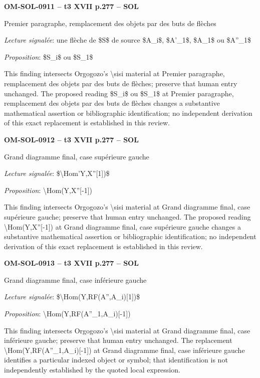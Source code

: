 \par\noindent\textbf{OM-SOL-0911 -- t3 XVII p.277 -- SOL}\par
Premier paragraphe, remplacement des objets par des buts de flèches\par
\emph{Lecture signalée}: une flèche de \$S\$ de source \$A\_i\$, \$A'\_1\$, \$A\_1\$ ou \$A''\_1\$\par
\emph{Proposition}: \$S\_i\$ ou \$S\_1\$\par
This finding intersects Orgogozo's \textbackslash{}sisi material at Premier paragraphe, remplacement des objets par des buts de flèches; preserve that human entry unchanged. The proposed reading \$S\_i\$ ou \$S\_1\$ at Premier paragraphe, remplacement des objets par des buts de flèches changes a substantive mathematical assertion or bibliographic identification; no independent derivation of this exact replacement is established in this review.\par
\par\noindent\textbf{OM-SOL-0912 -- t3 XVII p.277 -- SOL}\par
Grand diagramme final, case supérieure gauche\par
\emph{Lecture signalée}: \$\textbackslash{}Hom'Y,X''[1])\$\par
\emph{Proposition}: \textbackslash{}Hom(Y,X''[-1])\par
This finding intersects Orgogozo's \textbackslash{}sisi material at Grand diagramme final, case supérieure gauche; preserve that human entry unchanged. The proposed reading \textbackslash{}Hom(Y,X''[-1]) at Grand diagramme final, case supérieure gauche changes a substantive mathematical assertion or bibliographic identification; no independent derivation of this exact replacement is established in this review.\par
\par\noindent\textbf{OM-SOL-0913 -- t3 XVII p.277 -- SOL}\par
Grand diagramme final, case inférieure gauche\par
\emph{Lecture signalée}: \$\textbackslash{}Hom(Y,RF(A'',A\_i)[1])\$\par
\emph{Proposition}: \textbackslash{}Hom(Y,RF(A''\_1,A\_i)[-1])\par
This finding intersects Orgogozo's \textbackslash{}sisi material at Grand diagramme final, case inférieure gauche; preserve that human entry unchanged. The replacement \textbackslash{}Hom(Y,RF(A''\_1,A\_i)[-1]) at Grand diagramme final, case inférieure gauche identifies a particular indexed object or symbol; that identification is not independently established by the quoted local expression.\par
